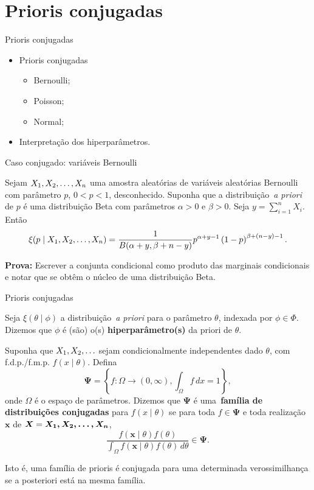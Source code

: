 \section*{Prioris conjugadas}
\begin{frame}{Prioris conjugadas}
 \begin{itemize}
  \item Prioris conjugadas
  \begin{itemize}
   \item Bernoulli;
   \item Poisson;
   \item Normal;
  \end{itemize}
\item Interpretação dos hiperparâmetros.
 \end{itemize}
\end{frame}

\begin{frame}{Caso conjugado: variáveis Bernoulli}
\begin{theo}
\label{thm:Bernoulli_posterior}
 Sejam $X_1, X_2, \ldots, X_n$ uma amostra aleatórias de variáveis aleatórias Bernoulli com parâmetro $p$, $ 0 < p < 1$, desconhecido.
 Suponha que a distribuição~\textit{a priori} de $p$ é uma distribuição Beta com parâmetros $\alpha > 0$ e $\beta > 0$.
 Seja $y = \sum_{i=1}^n X_i$. 
 Então
\[ \xi(p \mid X_1, X_2, \ldots, X_n) = \frac{1}{B(\alpha + y, \beta + n -y)} p^{\alpha + y- 1} \left(1-p\right)^{\beta + (n-y) - 1}.\]
\end{theo}
\textbf{Prova:}
 Escrever a conjunta condicional como produto das marginais condicionais e notar que se obtêm o núcleo de uma distribuição Beta.
\end{frame}

\begin{frame}{Prioris conjugadas}

\begin{defn}[Hiperparâmetros]
\label{def:hyperparameters}
Seja $\xi(\theta \mid \phi)$ a distribuição~\textit{a priori} para o parâmetro $\theta$, indexada por $\phi \in \Phi$.
  Dizemos que $\phi$ é (são) o(s) \textbf{hiperparâmetro(s)} da priori de $\theta$.
 \end{defn}

\begin{defn}
\label{def:conjugate_prior}
Suponha que $X_1, X_2, \ldots$ sejam condicionalmente independentes dado $\theta$, com f.d.p./f.m.p. $f(x \mid \theta)$.
Defina
\[ \boldsymbol{\Psi} = \left\{ f : \Omega \to (0, \infty) ,  \int_{\Omega} f\, dx = 1  \right\}, \]
onde $\Omega$ é o espaço de parâmetros.
Dizemos que $\boldsymbol{\Psi}$ é uma~\textbf{família de distribuições conjugadas} para $f(x \mid \theta)$ se para toda $f \in \boldsymbol{\Psi}$ e toda realização $\boldsymbol{x}$ de $\boldsymbol X = \boldsymbol{X_1, X_2, \ldots, X_n}$,
\[ \frac{f(\boldsymbol{x} \mid \theta) f(\theta)}{\int_{\Omega} f(\boldsymbol{x} \mid \theta) f(\theta)\,d\theta} \in \boldsymbol{\Psi}. \]
\end{defn}
Isto é, uma família de prioris é conjugada para uma determinada verossimilhança se a posteriori está na mesma família.
\end{frame}

